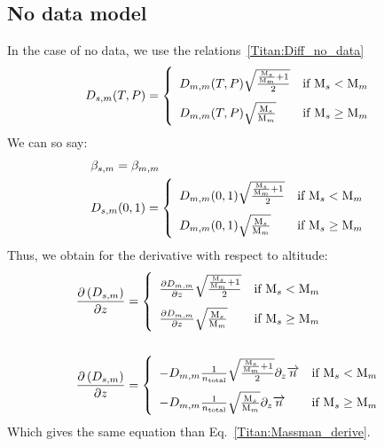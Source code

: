 \subsection{No data model}

In the case of no data, we use the relations~\ref{Titan:Diff_no_data}
\begin{equation}
\renewcommand{\arraystretch}{2}
\diff_{s,m}(T,P) =
\left\{\begin{array}{l@{\quad}r}
\diff_{m,m}(T,P)\sqrt{\frac{\frac{\Mm_s}{\Mm_m} + 1}{2}} & \text{if }\Mm_s < \Mm_m    \\
\diff_{m,m}(T,P)\sqrt{\frac{\Mm_s}{\Mm_m}}               & \text{if }\Mm_s \geq \Mm_m \\
\end{array}\right.
\label{Titan:Diff_no_data}
\end{equation}
We can so say:
\begin{equation}
\begin{split}
\renewcommand{\arraystretch}{2}
&\smas{s,m} = \smas{m,m} \\
&\Amas{s,m} =
\left\{\begin{array}{l@{\quad}r}
\Amas{m,m}\sqrt{\frac{\frac{\Mm_s}{\Mm_m} + 1}{2}} & \text{if }\Mm_s < \Mm_m    \\
\Amas{m,m}\sqrt{\frac{\Mm_s}{\Mm_m}}                    & \text{if }\Mm_s \geq \Mm_m \\
\end{array}\right.
\end{split}
\label{Titan:Diff_no_data_to_Massman}
\end{equation}
Thus, we obtain for the derivative with respect to altitude:
\begin{equation}
\begin{split}
\renewcommand{\arraystretch}{2}
\dOverdz{\diff_{s,m}} & =
\left\{\begin{array}{l@{\quad}r}
\doverdz{\diff_{m,m}}\sqrt{\frac{\frac{\Mm_s}{\Mm_m} + 1}{2}}  & \text{if } \Mm_s < \Mm_m    \\
\doverdz{\diff_{m,m}}\sqrt{\frac{\Mm_s}{\Mm_m}}                & \text{if } \Mm_s \geq \Mm_m \\
\end{array}\right. 
\\\\
\dOverdz{\diff_{s,m}} & =
\left\{\begin{array}{l@{\quad}r}
-\diff_{m,m}\frac{1}{\concAtm}\sqrt{\frac{\frac{\Mm_s}{\Mm_m} + 1}{2}}\divergez{\conc}  & \text{if } \Mm_s < \Mm_m    \\
-\diff_{m,m}\frac{1}{\concAtm}\sqrt{\frac{\Mm_s}{\Mm_m}}\divergez{\conc}                & \text{if } \Mm_s \geq \Mm_m \\
\end{array}\right. 
\end{split}
\label{Titan:diffusion_no_data_derive}
\end{equation}
Which gives the same equation than Eq.~\ref{Titan:Massman_derive}.

